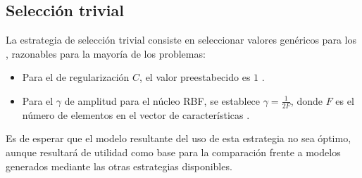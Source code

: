 %
%
\subsection{Selección trivial}
%
La estrategia de selección trivial consiste en seleccionar valores
genéricos para los , razonables para la mayoría de los
problemas:
%
\begin{itemize}
\item
  Para el \hparam{} de regularización $C$, el valor preestabecido es
  $1$ \cite{libsvm}.
\item
  Para el \hparam{} $\gamma$ de amplitud para el núcleo RBF, se
  establece $\gamma=\frac{1}{2F}$, donde $F$ es el número de elementos
  en el vector de características \cite{glasmachersigel}.
\end{itemize}
%
Es de esperar que el modelo resultante del uso de esta estrategia no
sea óptimo, aunque resultará de utilidad como base para la comparación
frente a modelos generados mediante las otras estrategias disponibles.

